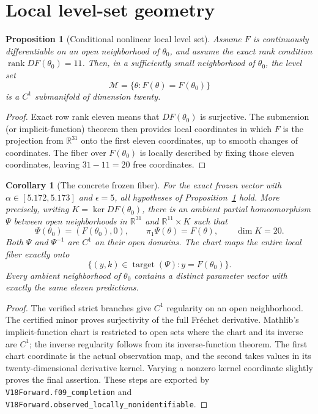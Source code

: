 \documentclass[11pt]{article}
\newtheorem{proposition}[theorem]{Proposition}
\newtheorem{corollary}[theorem]{Corollary}
\newcommand{\R}{\mathbb{R}}
\newcommand{\rank}{\operatorname{rank}}
\begin{document}
\section{Local level-set geometry}

\begin{proposition}[Conditional nonlinear local level set]
\label{prop:levelset}
Assume \(F\) is continuously differentiable on an open neighborhood of
\(\theta_0\), and assume the \emph{exact} rank condition
\(\rank DF(\theta_0)=11\). Then, in a sufficiently small neighborhood
of \(\theta_0\), the level set
\begin{equation}
  \mathcal M=\{\theta:F(\theta)=F(\theta_0)\}
\end{equation}
is a \(C^1\) submanifold of dimension twenty.
\end{proposition}
\begin{proof}
Exact row rank eleven means that \(DF(\theta_0)\) is surjective.
The submersion (or implicit-function) theorem then provides local
coordinates in which \(F\) is the projection from \(\R^{31}\)
onto the first eleven coordinates, up to smooth changes of coordinates.
The fiber over \(F(\theta_0)\) is locally described by fixing those
eleven coordinates, leaving \(31-11=20\) free coordinates.
\end{proof}

\begin{corollary}[The concrete frozen fiber]
For the exact frozen vector with $\alpha\in[5.172,5.173]$ and
$\epsilon=5$, all hypotheses of Proposition~\ref{prop:levelset} hold.
More precisely, writing $K=\ker DF(\theta_0)$, there is an ambient
partial homeomorphism $\Psi$ between open neighborhoods in
$\R^{31}$ and $\R^{11}\times K$ such that
\begin{equation}
 \Psi(\theta_0)=(F(\theta_0),0),\qquad
 \pi_1\Psi(\theta)=F(\theta),\qquad \dim K=20.
\end{equation}
Both $\Psi$ and $\Psi^{-1}$ are $C^1$ on their open domains. The chart
maps the entire local fiber exactly onto
\[
 \{(y,k)\in\operatorname{target}(\Psi):y=F(\theta_0)\}.
\]
Every ambient neighborhood of $\theta_0$ contains a distinct parameter
vector with exactly the same eleven predictions.
\end{corollary}
\begin{proof}
The verified strict branches give $C^1$ regularity on an open
neighborhood. The certified minor proves surjectivity of the full
Fr\'echet derivative. Mathlib's implicit-function chart is restricted to
open sets where the chart and its inverse are $C^1$; the inverse
regularity follows from its inverse-function theorem. The first chart
coordinate is the actual observation map, and the second takes values
in its twenty-dimensional derivative kernel. Varying a nonzero kernel
coordinate slightly proves the final assertion. These steps are
exported by \texttt{V18Forward.f09\_completion} and
\texttt{V18Forward.observed\_locally\_nonidentifiable}.
\end{proof}
\end{document}
